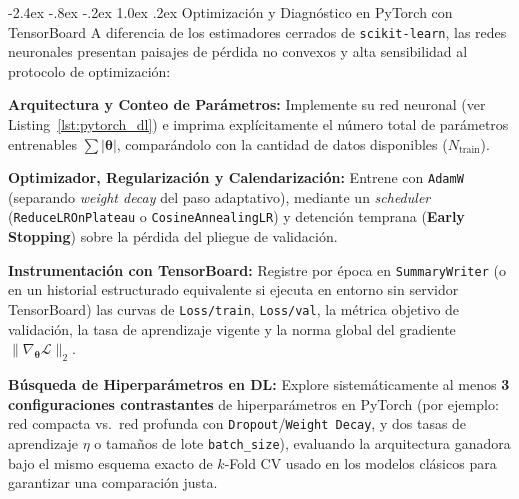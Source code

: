 \documentclass[11pt,a4paper]{article}
\makeatletter
\renewcommand\subsection{\@startsection{subsection}{2}{\z@}%
  {-2.4ex \@plus -.8ex \@minus -.2ex}%
  {1.0ex \@plus .2ex}%
  {\color{BlueAccent}\normalfont\large\bfseries}}
\let\origenumerate\enumerate
\let\endorigenumerate\endenumerate
\renewenvironment{enumerate}{\origenumerate\setlength{\itemsep}{2pt}\setlength{\parskip}{0pt}\setlength{\parsep}{0pt}}{\endorigenumerate}
\makeatother
\begin{document}
\subsection{Optimización y Diagnóstico en PyTorch con TensorBoard}
A diferencia de los estimadores cerrados de \texttt{scikit-learn}, las redes neuronales presentan paisajes de pérdida no convexos y alta sensibilidad al protocolo de optimización:
\begin{enumerate}
    \item \textbf{Arquitectura y Conteo de Parámetros:} Implemente su red neuronal (ver Listing~\ref{lst:pytorch_dl}) e imprima explícitamente el número total de parámetros entrenables $\sum |\bm{\theta}|$, comparándolo con la cantidad de datos disponibles ($N_{\text{train}}$).
    \item \textbf{Optimizador, Regularización y Calendarización:} Entrene con \texttt{AdamW} (separando \textit{weight decay} del paso adaptativo), mediante un \textit{scheduler} (\texttt{ReduceLROnPlateau} o \texttt{CosineAnnealingLR}) y detención temprana (\textbf{Early Stopping}) sobre la pérdida del pliegue de validación.
    \item \textbf{Instrumentación con TensorBoard:} Registre por época en \texttt{SummaryWriter} (o en un historial estructurado equivalente si ejecuta en entorno sin servidor TensorBoard) las curvas de \texttt{Loss/train}, \texttt{Loss/val}, la métrica objetivo de validación, la tasa de aprendizaje vigente y la norma global del gradiente $\|\nabla_{\bm{\theta}}\mathcal{L}\|_2$.
    \item \textbf{Búsqueda de Hiperparámetros en DL:} Explore sistemáticamente al menos \textbf{3 configuraciones contrastantes} de hiperparámetros en PyTorch (por ejemplo: red compacta vs.\ red profunda con \texttt{Dropout}/\texttt{Weight Decay}, y dos tasas de aprendizaje $\eta$ o tamaños de lote \texttt{batch\_size}), evaluando la arquitectura ganadora bajo el mismo esquema exacto de $k$-Fold CV usado en los modelos clásicos para garantizar una comparación justa.
\end{enumerate}
\end{document}
